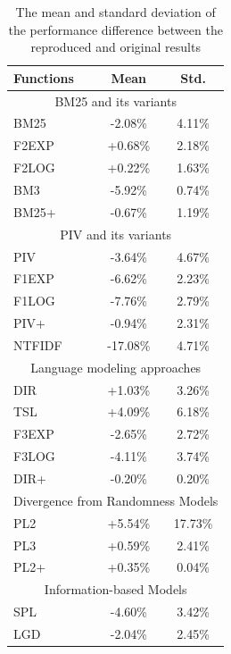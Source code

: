\begin{table}[t]
\centering
\caption{The mean and standard deviation of the performance difference 
between the reproduced and original results
\label{tab:r1_allmodels}
}
\begin{tabular}{ |l|c|c| } \hline
\textbf{Functions} & \textbf{Mean} & \textbf{Std.} \\ \hline \hline
\multicolumn{3}{|c|}{BM25 and its variants} \\ \hline 
BM25 & -2.08\% & 4.11\% \\ \hline
F2EXP & +0.68\% & 2.18\% \\ \hline
F2LOG & +0.22\% & 1.63\% \\ \hline
BM3 & -5.92\% & 0.74\% \\ \hline
BM25+ & -0.67\% & 1.19\% \\ \hline \hline 
\multicolumn{3}{|c|}{PIV and its variants} \\ \hline 
PIV & -3.64\% & 4.67\% \\ \hline
F1EXP & -6.62\% & 2.23\% \\ \hline
F1LOG & -7.76\% & 2.79\% \\ \hline
PIV+ & -0.94\% & 2.31\% \\ \hline
NTFIDF & -17.08\% & 4.71\% \\ \hline \hline 
\multicolumn{3}{|c|}{Language modeling approaches} \\ \hline 
DIR & +1.03\% & 3.26\% \\ \hline
TSL & +4.09\% & 6.18\% \\ \hline
F3EXP & -2.65\% & 2.72\% \\ \hline
F3LOG & -4.11\% & 3.74\% \\ \hline
DIR+ & -0.20\% & 0.20\% \\ \hline \hline 
\multicolumn{3}{|c|}{Divergence from Randomness Models} \\ \hline 
PL2 & +5.54\% & 17.73\% \\ \hline
PL3 & +0.59\% & 2.41\% \\ \hline
PL2+ & +0.35\% & 0.04\% \\ \hline \hline 
\multicolumn{3}{|c|}{Information-based Models} \\ \hline 
SPL & -4.60\% & 3.42\% \\ \hline
LGD & -2.04\% & 2.45\% \\ \hline
\end{tabular}
\end{table}


